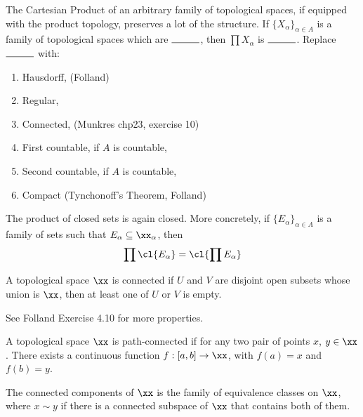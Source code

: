 \documentclass[../main-v2-manifolds.tex]{subfiles}
\begin{document}







The Cartesian Product of an arbitrary family of topological spaces, if equipped with the product topology, preserves a lot of the structure. If $\{X_\alpha\}_{\alpha\in A}$ is a family of topological spaces which are $\rule{1cm}{0.15mm}$, then $\prod X_\alpha$ is $\rule{1cm}{0.15mm}$. Replace $\rule{1cm}{0.15mm}$ with: 

\begin{enumerate}
    \item Hausdorff, (Folland)
    \item Regular,
    \item Connected, (Munkres chp23, exercise 10)
    \item First countable, if $A$ is countable,
    \item Second countable, if $A$ is countable,
    \item Compact (Tynchonoff's Theorem, Folland)
\end{enumerate}

\begin{wts}
    The product of closed sets is again closed. More concretely, if $\{E_\alpha\}_{\alpha\in A}$ is a family of sets such that $E_\alpha\subseteq\xx_\alpha$, then 
    \[
        \prod \cl{E_\alpha}=\cl{\prod E_\alpha}
    \]
\end{wts}



\begin{definition}[Connectedness]\label{chp4:connectedness-definition}
    A topological space $\xx$ is connected if $U$ and $V$ are disjoint open subsets whose union is $\xx$, then at least one of $U$ or $V$ is empty.
\end{definition}
See Folland Exercise 4.10 for more properties.

\begin{definition}\label{chp4:path-connectedness-definition}
    A topological space $\xx$ is path-connected if for any two pair of points $x$, $y\in\xx$. There exists a continuous function $f:[a,b]\to \xx$, with $f(a)=x$ and $f(b)=y$.
\end{definition}

\begin{definition}\label{chp4:connected-component-definition}
    The connected components of $\xx$ is the family of equivalence classes on $\xx$, where $x\sim y$ if there is a connected subspace of $\xx$ that contains both of them.
\end{definition}
\end{document}
